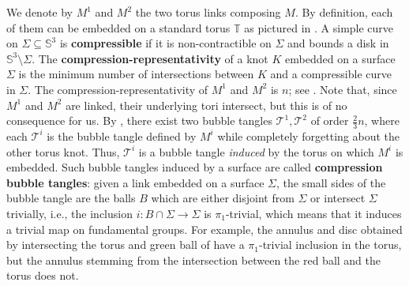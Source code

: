 \documentclass[10pt,a4paper]{amsart}
\newcommand{\To}{\mathbb{T}}
\newcommand{\T}{\mathcal{T}}
\begin{document}
We denote by $M^1$ and $M^2$ the two torus links composing $M$.
By definition, each of them can be embedded on a standard torus $\To$ as pictured in . A simple curve on $\Sigma \subseteq \mathbb{S}^3$ is \textbf{compressible} if it is non-contractible on $\Sigma$ and bounds a disk in $\mathbb{S}^3\setminus \Sigma$. The \textbf{compression-representativity} of a knot $K$ embedded on a surface $\Sigma$ is the minimum number of intersections between $K$ and a compressible curve in $\Sigma$. The compression-representativity of $M^1$ and $M^2$ is $n$; see \cite[Section~5]{Lunel_spherewidth_out}. Note that, since $M^1$ and $M^2$ are linked, their underlying tori intersect, but this is of no consequence for us. By \cite[Theorem~1.2]{Lunel_spherewidth_out}, there exist two bubble tangles $\T^1, \T^2$ of order $\frac{2}{3}n$, where each $\T^i$ is the bubble tangle defined by $M^i$ while completely forgetting about the other torus knot. Thus, $\T^i$ is a bubble tangle \emph{induced} by the torus on which $M^i$ is embedded. Such bubble tangles induced by a surface are called \textbf{compression bubble tangles}: given a link embedded on a surface $\Sigma$, the small sides of the bubble tangle are the balls $B$ which are either disjoint from $\Sigma$ or intersect $\Sigma$ trivially, i.e., the inclusion $i: B \cap \Sigma \rightarrow \Sigma$ is $\pi_1$-trivial, which means that it induces a trivial map on fundamental groups. For example, the annulus and disc obtained by intersecting the torus and green ball of  have a $\pi_1$-trivial inclusion in the torus, but the annulus stemming from the intersection between the red ball and the torus does not.
\end{document}
